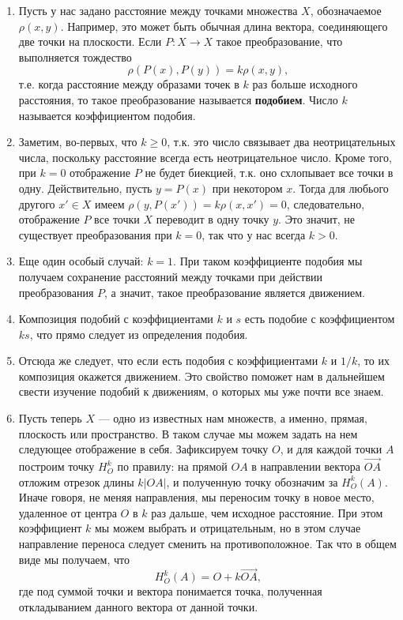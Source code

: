 \begin{enumerate}
\item Пусть у нас задано расстояние между точками множества $X$, обозначаемое $\rho(x,y)$. Например, это может быть обычная длина вектора, соединяющего две точки на плоскости. Если $P:X\to X$ такое преобразование, что выполняется тождество
$$
\rho(P(x),P(y)) = k\rho(x,y),
$$
т.е. когда расстояние между образами точек в $k$ раз больше исходного расстояния, то такое преобразование называется \textbf{подобием}. Число $k$ называется коэффициентом подобия.
\item Заметим, во-первых, что $k\ge 0$, т.к. это число связывает два неотрицательных числа, поскольку расстояние всегда есть неотрицательное число. Кроме того, при $k=0$ отображение $P$ не будет биекцией, т.к. оно схлопывает все точки в одну. Действительно, пусть $y=P(x)$ при некотором $x$. Тогда для любього другого $x'\in X$ имеем $\rho(y,P(x'))=k\rho(x,x')=0$, следовательно, отображение $P$ все точки $X$ переводит в одну точку $y$. Это значит, не существует преобразования при $k=0$, так что у нас всегда $k>0$.
\item Еще один особый случай: $k=1$. При таком коэффициенте подобия мы получаем сохранение расстояний между точками при действии преобразования $P$, а значит, такое преобразование является движением.
\item Композиция подобий с коэффициентами $k$ и $s$ есть подобие с коэффициентом $ks$, что прямо следует из определения подобия.
\item Отсюда же следует, что если есть подобия с коэффициентами $k$ и $1/k$, то их композиция окажется движением. Это свойство поможет нам в дальнейшем свести изучение подобий к движениям, о которых мы уже почти все знаем.
\item Пусть теперь $X$ --- одно из известных нам множеств, а именно, прямая, плоскость или пространство. В таком случае мы можем задать на нем следующее отображение в себя. Зафиксируем точку $O$, и для каждой точки $A$ построим точку $H_O^k$ по правилу: на прямой $OA$ в направлении вектора $\vec{OA}$ отложим отрезок длины $k|OA|$, и полученную точку обозначим за $H_O^k(A)$. Иначе говоря, не меняя направления, мы переносим точку в новое место, удаленное от центра $O$ в $k$ раз дальше, чем исходное расстояние. При этом коэффициент $k$ мы можем выбрать и отрицательным, но в этом случае направление переноса следует сменить на противоположное. Так что в общем виде мы получаем, что 
$$
H_O^k(A) = O + k\vec{OA},
$$
где под суммой точки и вектора понимается точка, полученная откладыванием данного вектора от данной точки.

\end{enumerate}
